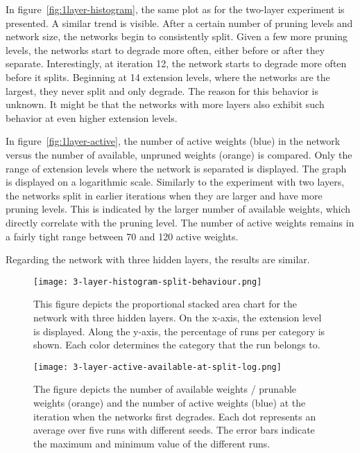 In figure~\ref{fig:1layer-histogram}, the same plot as for the two-layer experiment is presented.
A similar trend is visible.
After a certain number of pruning levels and network size, the networks begin to consistently split.
Given a few more pruning levels, the networks start to degrade more often, either before or after they separate.
Interestingly, at iteration 12, the network starts to degrade more often before it splits.
Beginning at 14 extension levels, where the networks are the largest, they never split and only degrade.
The reason for this behavior is unknown.
It might be that the networks with more layers also exhibit such behavior at even higher extension levels. 

In figure~\ref{fig:1layer-active}, the number of active weights (blue) in the network versus the number of available, unpruned weights (orange) is compared.
Only the range of extension levels where the network is separated is displayed.
The graph is displayed on a logarithmic scale.
Similarly to the experiment with two layers, the networks split in earlier iterations when they are larger and have more pruning levels.
This is indicated by the larger number of available weights, which directly correlate with the pruning level.
The number of active weights remains in a fairly tight range between 70 and 120 active weights.

Regarding the network with three hidden layers, the results are similar.
\begin{figure}[ht]
    \centering
    \texttt{[image: 3-layer-histogram-split-behaviour.png]}
    \caption{
        This figure depicts the proportional stacked area chart for the network with three hidden layers.
        On the x-axis, the extension level is displayed. 
        Along the y-axis, the percentage of runs per category is shown.
        Each color determines the category that the run belongs to.
    }\label{fig:3layer-histogram}
\end{figure}

\begin{figure}[ht] 
    \centering
    \texttt{[image: 3-layer-active-available-at-split-log.png]}
    \caption{
        The figure depicts the number of available weights / prunable weights (orange) and the number of active weights (blue) at the iteration when the networks first degrades.
    Each dot represents an average over five runs with different seeds.
    The error bars indicate the maximum and minimum value of the different runs.
    }\label{fig:3layer-active}
\end{figure}

